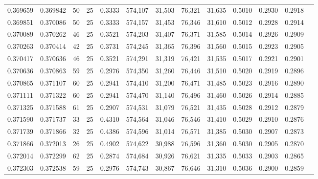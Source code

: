 \begin{tabular}{rrrrrrrrrrrrr}
0.369659 & 0.369842 &    50 &  25 &                                     0.3333 & 574,107 &  31,503 &  76,321 &  31,635 & 0.5010 & 0.2930 & 0.2918 \\
0.369851 & 0.370086 &    50 &  25 &                                     0.3333 & 574,157 &  31,453 &  76,346 &  31,610 & 0.5012 & 0.2928 & 0.2914 \\
0.370089 & 0.370262 &    46 &  25 &                                     0.3521 & 574,203 &  31,407 &  76,371 &  31,585 & 0.5014 & 0.2926 & 0.2909 \\
0.370263 & 0.370414 &    42 &  25 &                                     0.3731 & 574,245 &  31,365 &  76,396 &  31,560 & 0.5015 & 0.2923 & 0.2905 \\
0.370417 & 0.370636 &    46 &  25 &                                     0.3521 & 574,291 &  31,319 &  76,421 &  31,535 & 0.5017 & 0.2921 & 0.2901 \\
0.370636 & 0.370863 &    59 &  25 &                                     0.2976 & 574,350 &  31,260 &  76,446 &  31,510 & 0.5020 & 0.2919 & 0.2896 \\
0.370865 & 0.371107 &    60 &  25 &                                     0.2941 & 574,410 &  31,200 &  76,471 &  31,485 & 0.5023 & 0.2916 & 0.2890 \\
0.371111 & 0.371322 &    60 &  25 &                                     0.2941 & 574,470 &  31,140 &  76,496 &  31,460 & 0.5026 & 0.2914 & 0.2885 \\
0.371325 & 0.371588 &    61 &  25 &                                     0.2907 & 574,531 &  31,079 &  76,521 &  31,435 & 0.5028 & 0.2912 & 0.2879 \\
0.371590 & 0.371737 &    33 &  25 &                                     0.4310 & 574,564 &  31,046 &  76,546 &  31,410 & 0.5029 & 0.2910 & 0.2876 \\
0.371739 & 0.371866 &    32 &  25 &                                     0.4386 & 574,596 &  31,014 &  76,571 &  31,385 & 0.5030 & 0.2907 & 0.2873 \\
0.371866 & 0.372013 &    26 &  25 &                                     0.4902 & 574,622 &  30,988 &  76,596 &  31,360 & 0.5030 & 0.2905 & 0.2870 \\
0.372014 & 0.372299 &    62 &  25 &                                     0.2874 & 574,684 &  30,926 &  76,621 &  31,335 & 0.5033 & 0.2903 & 0.2865 \\
0.372303 & 0.372538 &    59 &  25 &                                     0.2976 & 574,743 &  30,867 &  76,646 &  31,310 & 0.5036 & 0.2900 & 0.2859 \\

\end{tabular}
